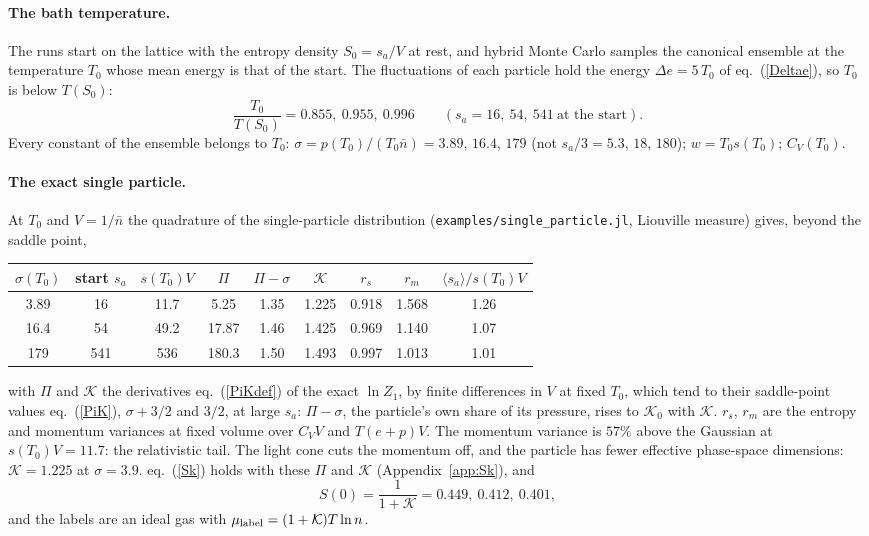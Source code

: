 \documentclass[11pt,aps,preprint,nofootinbib,superscriptaddress,tightenlines]{revtex4-2}
\newcommand{\avg}[1]{\langle #1\rangle}
\def\st{\begin{equation}}
\def\stp{\end{equation}}
\def\Eq#1{eq.~(\ref{#1})}
\def\App#1{Appendix~\ref{#1}}
\let\oldparagraph\paragraph
\renewcommand{\paragraph}{\par\bigskip\oldparagraph}
\begin{document}
\paragraph{The bath temperature.}  The runs start on the lattice with the entropy density $S_0=s_a/V$ at rest, and hybrid Monte Carlo samples
the canonical ensemble at the temperature $T_0$ whose mean energy is that of the start.  The fluctuations of each particle hold the energy $\Delta e=5\,T_0$
of \Eq{Deltae}, so $T_0$ is below $T(S_0)$:
\st
\frac{T_0}{T(S_0)}=0.855,\ 0.955,\ 0.996\qquad(s_a=16,\ 54,\ 541\ \text{at the start}).
\stp
Every constant of the ensemble belongs to $T_0$: $\sigma=p(T_0)/(T_0\bar n)=3.89$, $16.4$, $179$ (not $s_a/3=5.3$, $18$, $180$); $w=T_0s(T_0)$; $C_V(T_0)$.

\paragraph{The exact single particle.}  At $T_0$ and $V=1/\bar n$ the quadrature of the single-particle distribution (\texttt{examples/single\_particle.jl},
Liouville measure) gives, beyond the saddle point,
\begin{center}
\begin{tabular}{ccccccccc}
\toprule
$\sigma(T_0)$ & start $s_a$ & $s(T_0)V$ & $\Pi$ & $\Pi-\sigma$ & $\mathcal K$ & $r_s$ & $r_m$ & $\avg{s_a}/s(T_0)V$ \\
\midrule
3.89 & 16 & 11.7 & 5.25 & 1.35 & 1.225 & 0.918 & 1.568 & 1.26 \\
16.4 & 54 & 49.2 & 17.87 & 1.46 & 1.425 & 0.969 & 1.140 & 1.07 \\
179 & 541 & 536 & 180.3 & 1.50 & 1.493 & 0.997 & 1.013 & 1.01 \\
\bottomrule
\end{tabular}
\end{center}
with $\Pi$ and $\mathcal K$ the derivatives \Eq{PiKdef} of the exact $\ln Z_1$, by finite differences in $V$ at fixed $T_0$, which tend to their saddle-point
values \Eq{PiK}, $\sigma+3/2$ and $3/2$, at large $s_a$: $\Pi-\sigma$, the particle's own share of its pressure, rises to $\mathcal K_0$ with $\mathcal K$.  $r_s$, $r_m$ are
the entropy and momentum variances at fixed volume over $C_VV$ and $T(e+p)V$.  The momentum variance is $57\%$ above the Gaussian at $s(T_0)V=11.7$: the
relativistic tail.  The light cone cuts the momentum off, and the particle has fewer effective phase-space dimensions: $\mathcal K=1.225$ at $\sigma=3.9$.
\Eq{Sk} holds with these $\Pi$ and $\mathcal K$ (\App{app:Sk}), and
\st
S(0)=\frac1{1+\mathcal K}=0.449,\ 0.412,\ 0.401 ,
\stp
and the labels are an ideal gas with $\mu_{\rm label}=(1+\mathcal K)T\ln n$.
\end{document}
